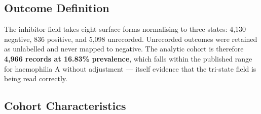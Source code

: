 \documentclass[conference]{IEEEtran}
\begin{document}
\subsection{Outcome Definition}
The inhibitor field takes eight surface forms normalising to three states:
4{,}130 negative, 836 positive, and 5{,}098 unrecorded. Unrecorded outcomes
were retained as unlabelled and never mapped to negative. The analytic cohort
is therefore \textbf{4{,}966 records at 16.83\% prevalence}, which falls within
the published range for haemophilia A without adjustment --- itself evidence
that the tri-state field is being read correctly.

\subsection{Cohort Characteristics}
\end{document}
